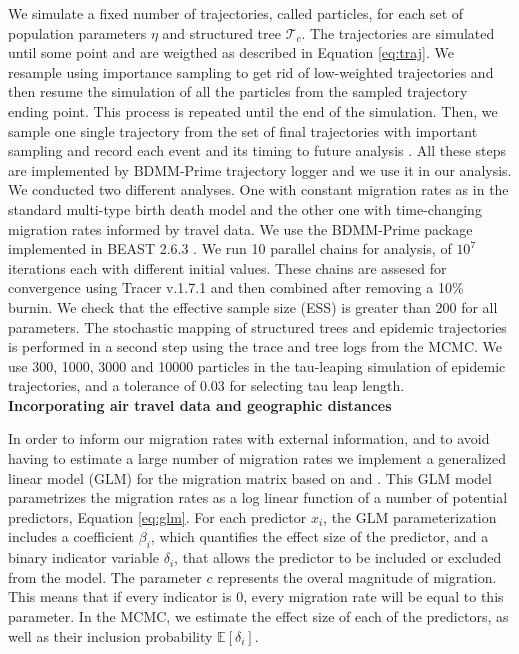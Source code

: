 We simulate a fixed number of trajectories, called particles, for each set of population parameters $\eta$ and structured tree $\mathcal{T}_c$. The trajectories are simulated until some point and are weigthed as described in Equation \ref{eq:traj}. We resample using importance sampling to get rid of low-weighted trajectories and then resume the simulation of all the particles from the sampled trajectory ending point. This process is repeated until the end of the simulation. Then, we sample one single trajectory from the set of final trajectories with important sampling and record each event and its timing to future analysis \cite{VaughanWIP}. All these steps are implemented by BDMM-Prime trajectory logger and we use it in our analysis.\\

We conducted two different analyses. One with constant migration rates as in the standard multi-type birth death model and the other one with time-changing migration rates informed by travel data. We use the BDMM-Prime package \cite{bdmmp} implemented in BEAST 2.6.3 \cite{beast}. We run 10 parallel chains for analysis, of $10^7$ iterations each with different initial values. These chains are assesed for convergence using Tracer v.1.7.1 and then combined after removing a 10\% burnin. We check that the effective sample size (ESS) is greater than 200 for all parameters. The stochastic mapping of structured trees and epidemic trajectories is performed in a second step using the trace and tree logs from the MCMC. We use 300, 1000, 3000 and 10000 particles in the tau-leaping simulation of epidemic trajectories, and a tolerance of 0.03 for selecting tau leap length.\\


\textbf{Incorporating air travel data and geographic distances}

In order to inform our migration rates with external information, and to avoid having to estimate a large number of migration rates we implement a generalized linear model (GLM) for the migration matrix based on \cite{Lemey2014} and \cite{Nicola2019}. This GLM model parametrizes the migration rates as a log linear function of a number of potential predictors, Equation \ref{eq:glm}. For each predictor $x_i$, the GLM parameterization includes a coefficient $\beta_i$, which quantifies the effect size of the predictor, and a binary indicator variable $\delta_i$, that allows the predictor to be included or excluded from the model. The parameter $c$ represents the overal magnitude of migration. This means that if every indicator is 0, every migration rate will be equal to this parameter. In the MCMC, we estimate the effect size of each of the predictors, as well as their inclusion probability $\mathbb{E}[\delta_i]$.

